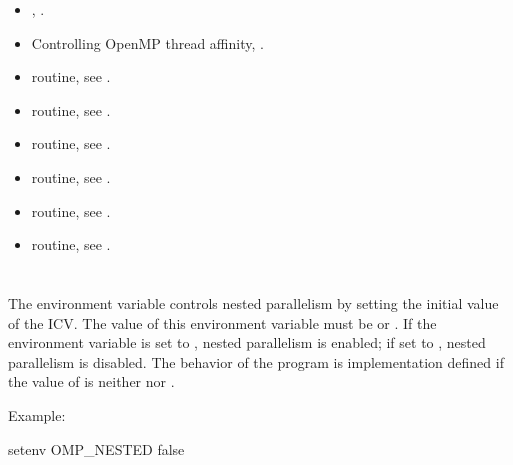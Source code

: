 \crossreferences
\begin{itemize}
\item {}, .

\item Controlling OpenMP thread affinity, .

\item {} routine, see .

\item {} routine, see .

\item {} routine, see .

\item {} routine, see .

\item {} routine, see .

\item {} routine, see .
\end{itemize}










\section{}
\label{sec:OMP_NESTED}
The  environment variable controls nested parallelism by setting the 
initial value of the  ICV. The value of this environment variable must be  
or . If the environment variable is set to , nested parallelism is enabled; if 
set to , nested parallelism is disabled. The behavior of the program is 
implementation defined if the value of  is neither  nor .

Example:
\begin{boxedcode}
setenv OMP\_NESTED false
\end{boxedcode}

